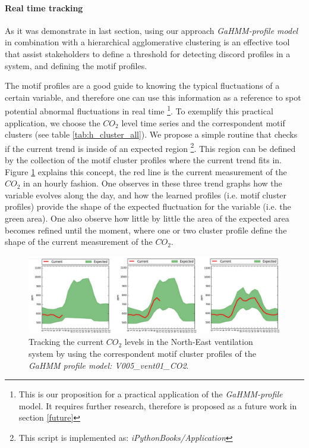 \paragraph{Real time tracking} As it was demonstrate in last section, using our approach \textit{GaHMM-profile model} in combination with a hierarchical agglomerative clustering is an effective tool that assist stakeholders to define a threshold for detecting discord profiles in a system, and defining the motif profiles. 

The motif profiles are a good guide to knowing the typical fluctuations of a certain variable, and therefore one can use this information as a reference to spot potential abnormal fluctuations in real time \footnote{This is our proposition for a practical application of the \textit{GaHMM-profile} model. It requires further research, therefore is proposed as a future work in section \ref{future}}. To exemplify this practical application, we choose the $CO_2$ level time series and the correspondent motif clusters (see table \ref{tab:h_cluster_all}). We propose a simple routine that checks if the current trend is inside of an expected region \footnote{This script is implemented as: \textit{iPythonBooks/Application}}. This region can be defined by the collection of the motif cluster profiles where the current trend fits in. Figure \ref{fig:real_time_1} explains this concept, the red line is the current measurement of the $CO_2$ in an hourly fashion. One observes in these three trend graphs how the variable evolves along the day, and how the learned profiles (i.e. motif cluster profiles) provide the shape of the expected fluctuation for the variable (i.e. the green area). One also observe how little by little the area of the expected area becomes refined until the moment, where one or two cluster profile define the shape of the current measurement of the $CO_2$.  

\begin{figure}[h!]
  \vspace{0.5em} %
  \includegraphics[scale=0.7]{Figures/real_time_1.jpg}
  \caption{Tracking the current $CO_2$ levels in the North-East ventilation system by using the correspondent motif cluster profiles of the \textit{GaHMM  profile model: V005\_vent01\_CO2}.}
  \label{fig:real_time_1}
\end{figure}

